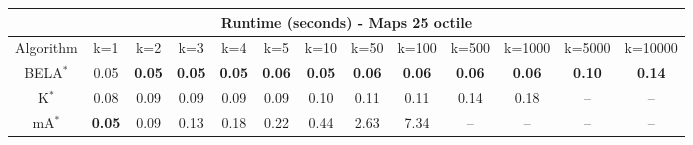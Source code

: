 \begin{tabular}{c|cccccccccccc}\toprule
\multicolumn{13}{c}{Runtime (seconds) - Maps 25 octile}\\ \midrule
Algorithm & k=1 & k=2 & k=3 & k=4 & k=5 & k=10 & k=50 & k=100 & k=500 & k=1000 & k=5000 & k=10000 \\ \midrule
BELA$^*$ & 0.05 & \textbf{0.05} & \textbf{0.05} & \textbf{0.05} & \textbf{0.06} & \textbf{0.05} & \textbf{0.06} & \textbf{0.06} & \textbf{0.06} & \textbf{0.06} & \textbf{0.10} & \textbf{0.14} \\
K$^*$ & 0.08 & 0.09 & 0.09 & 0.09 & 0.09 & 0.10 & 0.11 & 0.11 & 0.14 & 0.18 & -- & -- \\
mA$^*$ & \textbf{0.05} & 0.09 & 0.13 & 0.18 & 0.22 & 0.44 & 2.63 & 7.34 & -- & -- & -- & -- \\ \bottomrule 
\end{tabular}
